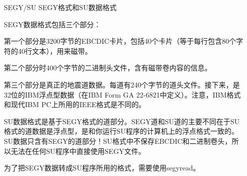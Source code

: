 \begin{enumerate}
	\item[SEGY/SU] SEGY格式和SU数据格式\par
	SEGY数据格式包括三个部分：\par
	第一个部分是3200字节的EBCDIC卡片，包括40个卡片（等于每行包含80个字符的40行文本），用来磁带。\par
	第二个部分时400个字节的二进制头文件，含有磁带卷内容的信息。\par
	第三个部分是真正的地震道数据。每道有240个字节的道头文件。接下来，是32位的IBM浮点型数据（在IBM Form GA 22-6821中定义）。注意，IBM格式和现代IBM PC上所用的IEEE格式是不同的。\par
	SU数据格式是基于SEGY格式的道部分。SEGY道和SU道的主要不同在于SU格式的道数据是浮点型，是和你运行SU程序的计算机上的浮点格式一致的。SU数据只含有SEGY的道部分！SU格式中不保存EBCDIC和二进制卷头，所以无法在任何SU程序中直接使用SEGY文件。\par
	为了把SEGY数据转成SU程序所用的格式，需要使用segyread。
	

\end{enumerate}
